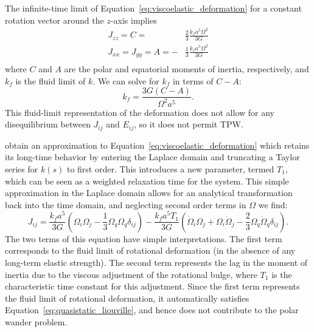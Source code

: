\documentclass[extra,mreferee]{gji}
\begin{document}
The infinite-time limit of Equation~\eqref{eq:viscoelastic_deformation} for a 
constant rotation vector around the $z$-axis implies
\begin{equation}
\begin{aligned}
J_{zz} = C = &\frac{2}{3} \frac{k_f a^5 \Omega^2}{3 G} \\
J_{xx} = J_{yy} = A = -&\frac{1}{3} \frac{k_f a^5 \Omega^2}{3 G} \\
\end{aligned}
\end{equation}
where $C$ and $A$ are the polar and equatorial moments of inertia, respectively, 
and $k_f$ is the fluid limit of $k$. 
We can solve for $k_f$ in terms of $C-A$:
\begin{equation}
k_f = \frac{3 G (C-A)}{\Omega^2 a^5}.
\label{eq:fluid_love}
\end{equation}
This fluid-limit representation of the deformation does not allow for any disequilibrium between $J_{ij}$ and $E_{ij}$,
so it does not permit TPW.

\citet{ricard1993polar} obtain an approximation to Equation~\eqref{eq:viscoelastic_deformation} which retains its long-time behavior by entering the Laplace domain and truncating a Taylor series for $k(s)$ to first order.  
This introduces a new parameter, termed $T_1$, which can be seen as a weighted relaxation time for the system.  
This simple approximation in the Laplace domain allows for an analytical transformation back into the time domain, and neglecting second order terms in $\dot{\Omega}$ we find:
\begin{equation}
J_{ij} = \frac{k_f a^5}{3 G} \left( \Omega_i \Omega_j - \frac{1}{3} \Omega_q \Omega_q \delta_{ij} \right) -
 \frac{k_f a^5 T_1}{3G} \left(\dot{\Omega}_i \Omega_j + \Omega_i \dot{\Omega}_j - \frac{2}{3} \Omega_q \dot{\Omega}_q \delta_{ij} \right).
\label{eq:rotational_deformation}
\end{equation}
The two terms of this equation have simple interpretations.  
The first term corresponds to the fluid limit of rotational deformation (in the absence of any long-term elastic strength).  
The second term represents the lag in the moment of inertia due to the viscous adjustment of the rotational bulge, where $T_1$ is the characteristic time constant for this adjustment.
Since the first term represents the fluid limit of rotational deformation, it automatically satisfies Equation~\eqref{eq:quasistatic_liouville}, and hence does not contribute to the polar wander problem.
\end{document}

